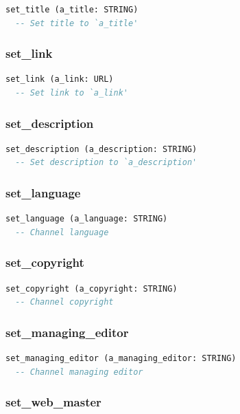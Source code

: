 \begin{lstlisting}[language=Eiffel]
set_title (a_title: STRING)
  -- Set title to `a_title'
\end{lstlisting}

\subsubsection{set\_link}

\begin{lstlisting}[language=Eiffel]
set_link (a_link: URL)
  -- Set link to `a_link'
\end{lstlisting}

\subsubsection{set\_description}

\begin{lstlisting}[language=Eiffel]
set_description (a_description: STRING)
  -- Set description to `a_description'
\end{lstlisting}

\subsubsection{set\_language}

\begin{lstlisting}[language=Eiffel]
set_language (a_language: STRING)
  -- Channel language
\end{lstlisting}

\subsubsection{set\_copyright}

\begin{lstlisting}[language=Eiffel]
set_copyright (a_copyright: STRING)
  -- Channel copyright
\end{lstlisting}

\subsubsection{set\_managing\_editor}

\begin{lstlisting}[language=Eiffel]
set_managing_editor (a_managing_editor: STRING)
  -- Channel managing editor
\end{lstlisting}

\subsubsection{set\_web\_master}

